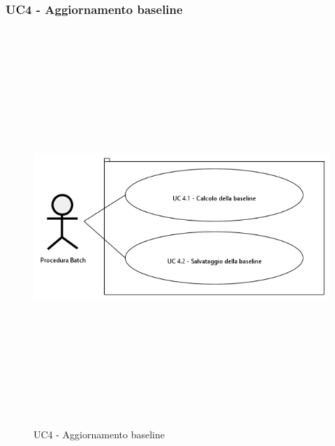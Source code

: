 \newpage

            \subsubsection{UC4 - Aggiornamento baseline}

                \begin{figure}[H]
                    \centering
                    \includegraphics[width=13cm,height=15cm,keepaspectratio]{./images/UC4.png}
                    \caption{UC4 - Aggiornamento baseline}
                \end{figure}

